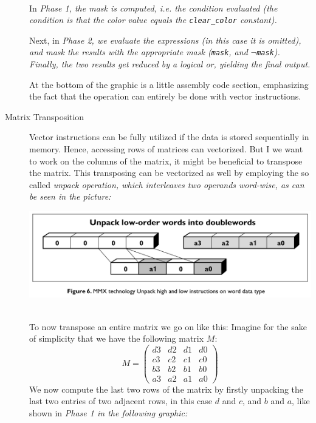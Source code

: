\documentclass[../../main.tex]{subfiles}
\begin{document}
\begin{description}
    ~\\
    In \em Phase 1\em , the mask is computed, i.e. the condition evaluated (the condition is that the color value equals the \texttt{clear\_color} constant).

    Next, in \em Phase 2\em , we evaluate the expressions (in this case it is omitted), and mask the results with the appropriate mask (\texttt{mask}, and $\lnot$\texttt{mask}). Finally, the two results get reduced by a logical or, yielding the final output.

    At the bottom of the graphic is a little assembly code section, emphasizing the fact that the operation can entirely be done with vector instructions.

    \bigskip
    \item[Matrix Transposition] Vector instructions can be fully utilized if the data is stored sequentially in memory. Hence, accessing rows of matrices can vectorized. But I we want to work on the columns of the matrix, it might be beneficial to transpose the matrix. This transposing can be vectorized as well by employing the so called \em unpack \em operation, which interleaves two operands word-wise, as can be seen in the picture:

    \includegraphics[width=\textwidth]{Chapters/07/unpack.png}

    ~\\
    To now transpose an entire matrix we go on like this: Imagine for the sake of simplicity that we have the following matrix $M$:
    \[ M = \begin{pmatrix}
        d3 & d2 & d1 & d0 \\
        c3 & c2 & c1 & c0 \\
        b3 & b2 & b1 & b0 \\
        a3 & a2 & a1 & a0
    \end{pmatrix}\]
    We now compute the last two rows of the matrix by firstly unpacking the last two entries of two adjacent rows, in this case $d$ and $c$, and $b$ and $a$, like shown in \em Phase 1 \em in the following graphic:


\end{description}
\end{document}
